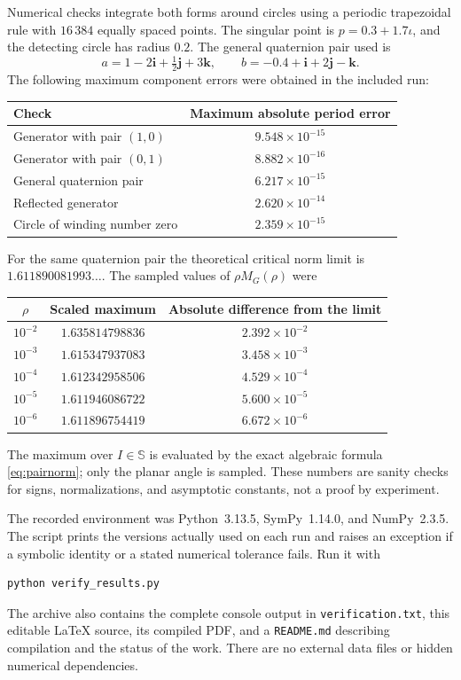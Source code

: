 \documentclass[11pt,a4paper]{article}
\numberwithin{equation}{section}
\theoremstyle{definition}
\theoremstyle{remark}
\newcommand{\SSS}{\mathbb S}
\begin{document}
Numerical checks integrate both forms around circles using a periodic
trapezoidal rule with $16\,384$ equally spaced points. The singular point is
$p=0.3+1.7\iota$, and the detecting circle has radius $0.2$. The general
quaternion pair used is
\[
 a=1-2\mathbf i+\tfrac12\mathbf j+3\mathbf k,\qquad
 b=-0.4+\mathbf i+2\mathbf j-\mathbf k.
\]
The following maximum component errors were obtained in the included run:
\begin{center}
\small
\begin{tabular}{@{}lc@{}}
\toprule
Check & Maximum absolute period error\\
\midrule
Generator with pair $(1,0)$ & $9.548\times10^{-15}$\\
Generator with pair $(0,1)$ & $8.882\times10^{-16}$\\
General quaternion pair & $6.217\times10^{-15}$\\
Reflected generator & $2.620\times10^{-14}$\\
Circle of winding number zero & $2.359\times10^{-15}$\\
\bottomrule
\end{tabular}
\end{center}
For the same quaternion pair the theoretical critical norm limit is
$1.611890081993\ldots$. The sampled values of $\rho M_G(\rho)$ were
\begin{center}
\small
\begin{tabular}{@{}ccc@{}}
\toprule
$\rho$ & Scaled maximum & Absolute difference from the limit\\
\midrule
$10^{-2}$ & $1.635814798836$ & $2.392\times10^{-2}$\\
$10^{-3}$ & $1.615347937083$ & $3.458\times10^{-3}$\\
$10^{-4}$ & $1.612342958506$ & $4.529\times10^{-4}$\\
$10^{-5}$ & $1.611946086722$ & $5.600\times10^{-5}$\\
$10^{-6}$ & $1.611896754419$ & $6.672\times10^{-6}$\\
\bottomrule
\end{tabular}
\end{center}
The maximum over $I\in\SSS$ is evaluated by the exact algebraic formula
\eqref{eq:pairnorm}; only the planar angle is sampled. These numbers are
sanity checks for signs, normalizations, and asymptotic constants, not a
proof by experiment.

The recorded environment was Python~3.13.5, SymPy~1.14.0, and NumPy~2.3.5.
The script prints the versions actually used on each run and raises an
exception if a symbolic identity or a stated numerical tolerance fails.
Run it with
\begin{verbatim}
python verify_results.py
\end{verbatim}
The archive also contains the complete console output in
\texttt{verification.txt}, this editable LaTeX source, its compiled PDF,
and a \texttt{README.md} describing compilation and the status of the work.
There are no external data files or hidden numerical dependencies.
\end{document}
